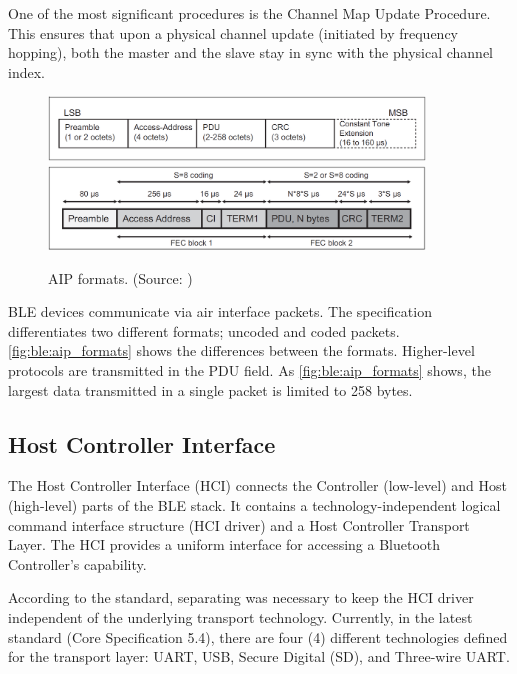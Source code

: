 One of the most significant procedures is the Channel Map Update Procedure.
This ensures that upon a physical channel update (initiated by
frequency hopping), both the master and the slave stay in sync
with the physical channel index.

\begin{figure}
    \centering
    \includegraphics[width=100mm, keepaspectratio]{figures/ble_aip_uncoded.png}\\\vspace{5mm}
    \includegraphics[width=100mm, keepaspectratio]{figures/ble_aip_coded.png}
    \caption{AIP formats. (Source: \cite{bt52})}
    \label{fig:ble:aip_formats}
\end{figure}

BLE devices communicate via air interface packets.
The specification differentiates two different formats; uncoded and coded packets.
\autoref{fig:ble:aip_formats} shows the differences between the formats.
Higher-level protocols are transmitted in the PDU field.
As \autoref{fig:ble:aip_formats} shows, the largest data transmitted in a single packet is limited to 258 bytes.

\subsection{Host Controller Interface}
\label{ble:hci}
The Host Controller Interface (HCI) connects the Controller (low-level) and Host (high-level) parts of the BLE stack.
It contains a technology-independent logical command interface structure (HCI driver) and a Host Controller Transport Layer.
The HCI provides a uniform interface for accessing a Bluetooth Controller's capability.

According to the standard, separating was necessary to keep the HCI driver independent of the underlying transport technology.
Currently, in the latest standard (Core Specification 5.4), there are four (4) different technologies defined for the transport layer:
UART, USB, Secure Digital (SD), and Three-wire UART.

